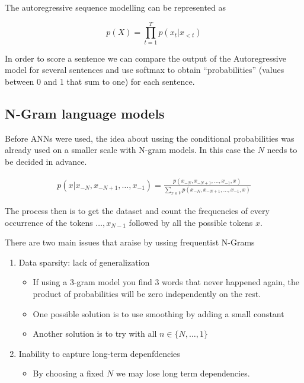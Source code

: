 \documentclass[b5paper]{report}
\begin{document}
The autoregressive sequence modelling can be represented as

\begin{equation}
  p(X) = \prod_{t=1}^T p(x_t|x_{<t})
\end{equation}

In order to score a sentence we can compare the output of the Autoregressive
model for several sentences and use softmax to obtain ``probabilities'' (values
between 0 and 1 that sum to one) for each sentence.

\subsection{N-Gram language models}

Before \glspl{ANN} were used, the idea about ussing the conditional probabilities was
already used on a smaller scale with N-gram models. In this case the $N$ needs
to be decided in advance.

\begin{align}
  p(x|x_{-N},x_{-N+1},\dots,x_{-1}) = \frac{p(x_{-N},x_{-N+1},\dots,x_{-1}, x)} {\sum_{x \in V}p(x_{-N},x_{-N+1},\dots,x_{-1}, x)}
\end{align}

The process then is to get the dataset and count the frequencies of every
occurrence of the tokens $\dots,x_{N-1}$ followed by all the possible tokens
$x$.

There are two main issues that araise by ussing frequentist N-Grams

\begin{enumerate}
  \item Data sparsity: lack of generalization
    \begin{itemize}
      \item If using a 3-gram model you find 3 words that never happened again,
        the product of probabilities will be zero independently on the rest.
      \item One possible solution is to use smoothing by adding a small
        constant
      \item Another solution is to try with all $n \in \{N,\dots,1\}$
    \end{itemize}
  \item Inability to capture long-term depenfdencies
\begin{itemize}
  \item By choosing a fixed $N$ we may lose long term dependencies.
\end{itemize}
\end{enumerate}
\end{document}

